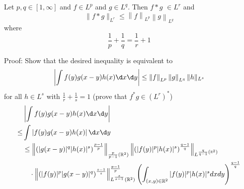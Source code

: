 \documentclass[12pt, a4paper, oneside]{book}
\begin{document}
\section{}
\begin{theorem}[Young's]
    Let $p, q\in[1, \infty]$ and $f \in L^p$ and $g\in L^q$. Then $f * g$ $\in L^r$ and
    \begin{equation*}
        \|f * g\|_{L^r}
        \leq
        \left\| f \right\|_{L^p}
        \left\| g \right\|_{L^q}
    \end{equation*}
    where
    \begin{equation*}
        \frac{1}{p}+\frac{1}{q}=\frac{1}{r}+1
    \end{equation*}

    Proof:
    Show that the desired inequality is equivalent to
    \begin{equation*}
        \left|\int f(y) g(x-y) h(x) \d x \d y\right|
        \leq
        \left\| f \right\|_{L^p}\left\| g \right\|_{L^q}\|h\|_{L^s}
    \end{equation*}
    for all $h \in L^s$ with $\frac{1}{r}+\frac{1}{s}=1$ (prove that $f^*g \in \left(L^r\right)^*$)
    \begin{equation*}
        \begin{aligned}
                 & \left|\int f(y) g(x-y) h(x) \d x \d y\right|                                                                                                                                                                                                                               \\
            \leq & \int \left|f(y) g(x-y) h(x)\right| \d x \d y                                                                                                                                                                                                                               \\
                 & \leq \left\|\left(|g(x-y)|^q|h(x)|^s\right)^{\frac{p-1}{p}}\right\|_{\frac{p}{p-1}\left(\mathbb{R}^2\right)}\left\|\left(|f(y)|^p|h(x)|^s\right)^{\frac{q-1}{q}}\right\|_{L^{\frac{q}{q-1}\left(\mathbb{R}^2\right)}}                                                      \\
                 & \quad \cdot\left\|\left(|f(y)|^p|g(x-y)|^q\right)^{\frac{s-1}{s}}\right\|_{L^{\frac{s}{s-1}}\left(\mathbb{R}^2\right)}^{\frac{p-1}{p}}\left(\int_{(x, y) \in \mathbb{R}^2}|f(y)|^p|h(x)|^s d x d y\right)^{\frac{q-1}{q}}                                                  \\

\end{aligned}
\end{equation*}
\end{theorem}
\end{document}
